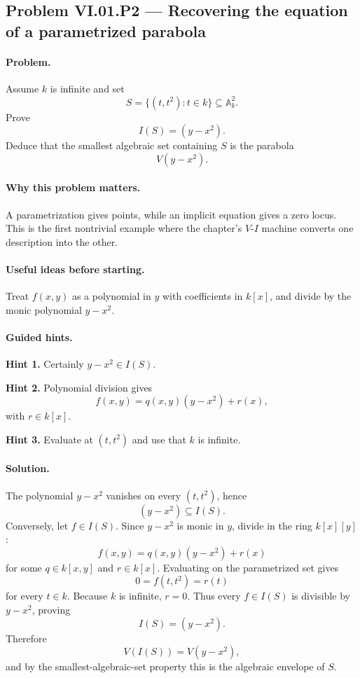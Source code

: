\subsection*{Problem VI.01.P2 --- Recovering the equation of a parametrized parabola}
\label{prob:vi01-p2}

\paragraph{Problem.}
Assume \(k\) is infinite and set
\[
S=\{(t,t^2):t\in k\}\subseteq\mathbb A_k^2.
\]
Prove
\[
I(S)=(y-x^2).
\]
Deduce that the smallest algebraic set containing \(S\) is the parabola
\[
V(y-x^2).
\]

\ifdefined\FullProblemDossiers
\paragraph{Why this problem matters.}
A parametrization gives points, while an implicit equation gives a zero locus.  This is the
first nontrivial example where the chapter's \(V\)-\(I\) machine converts one description
into the other.

\paragraph{Useful ideas before starting.}
Treat \(f(x,y)\) as a polynomial in \(y\) with coefficients in \(k[x]\), and divide by the
monic polynomial \(y-x^2\).

\paragraph{Guided hints.}
\textbf{Hint 1.} Certainly \(y-x^2\in I(S)\).

\textbf{Hint 2.} Polynomial division gives
\[
f(x,y)=q(x,y)(y-x^2)+r(x),
\]
with \(r\in k[x]\).

\textbf{Hint 3.} Evaluate at \((t,t^2)\) and use that \(k\) is infinite.

\paragraph{Solution.}
The polynomial \(y-x^2\) vanishes on every \((t,t^2)\), hence
\[
(y-x^2)\subseteq I(S).
\]
Conversely, let \(f\in I(S)\).  Since \(y-x^2\) is monic in \(y\), divide in the ring
\(k[x][y]\):
\[
f(x,y)=q(x,y)(y-x^2)+r(x)
\]
for some \(q\in k[x,y]\) and \(r\in k[x]\).  Evaluating on the parametrized set gives
\[
0=f(t,t^2)=r(t)
\]
for every \(t\in k\).  Because \(k\) is infinite, \(r=0\).  Thus every \(f\in I(S)\) is
divisible by \(y-x^2\), proving
\[
I(S)=(y-x^2).
\]
Therefore
\[
V(I(S))=V(y-x^2),
\]
and by the smallest-algebraic-set property this is the algebraic envelope of \(S\).

